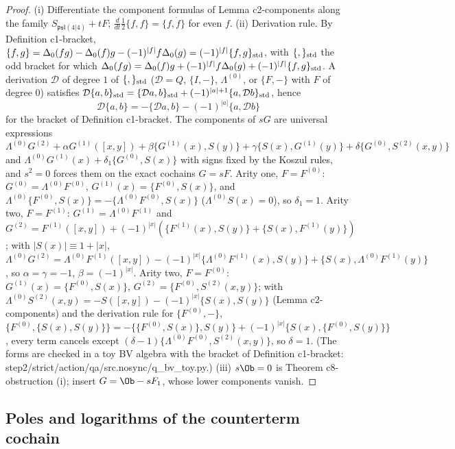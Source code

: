 \begin{proof}
(i) Differentiate the component formulas of Lemma c2-components along the family $S_{\mathfrak{psl}(4|4)}+tF$; $\tfrac{d}{dt}\tfrac12\{f,f\}=\{f,\dot f\}$ for even $f$. (ii) Derivation rule. By Definition c1-bracket, $\{f,g\}=\Delta_0(fg)-\Delta_0(f)g-(-1)^{|f|}f\Delta_0(g)=(-1)^{|f|}\{f,g\}_{\rm std}$, with $\{,\}_{\rm std}$ the odd bracket for which $\Delta_0(fg)=\Delta_0(f)g+(-1)^{|f|}f\Delta_0(g)+(-1)^{|f|}\{f,g\}_{\rm std}$. A derivation $\mathcal D$ of degree $1$ of $\{,\}_{\rm std}$ ($\mathcal D=Q$, $\{I,-\}$, $\Lambda^{(0)}$, or $\{F,-\}$ with $F$ of degree $0$) satisfies $\mathcal D\{a,b\}_{\rm std}=\{\mathcal Da,b\}_{\rm std}+(-1)^{|a|+1}\{a,\mathcal Db\}_{\rm std}$, hence
\[
\mathcal D\{a,b\}=-\{\mathcal Da,b\}-(-1)^{|a|}\{a,\mathcal Db\}
\]
for the bracket of Definition c1-bracket. The components of $sG$ are universal expressions $\Lambda^{(0)}G^{(2)}+\alpha G^{(1)}([x,y])+\beta\{G^{(1)}(x),S(y)\}+\gamma\{S(x),G^{(1)}(y)\}+\delta\{G^{(0)},S^{(2)}(x,y)\}$ and $\Lambda^{(0)}G^{(1)}(x)+\delta_1\{G^{(0)},S(x)\}$ with signs fixed by the Koszul rules, and $s^2=0$ forces them on the exact cochains $G=sF$. Arity one, $F=F^{(0)}$: $G^{(0)}=\Lambda^{(0)}F^{(0)}$, $G^{(1)}(x)=\{F^{(0)},S(x)\}$, and $\Lambda^{(0)}\{F^{(0)},S(x)\}=-\{\Lambda^{(0)}F^{(0)},S(x)\}$ ($\Lambda^{(0)}S(x)=0$), so $\delta_1=1$. Arity two, $F=F^{(1)}$: $G^{(1)}=\Lambda^{(0)}F^{(1)}$ and $G^{(2)}=F^{(1)}([x,y])+(-1)^{|x|}(\{F^{(1)}(x),S(y)\}+\{S(x),F^{(1)}(y)\})$; with $|S(x)|\equiv1+|x|$, $\Lambda^{(0)}G^{(2)}=\Lambda^{(0)}F^{(1)}([x,y])-(-1)^{|x|}\{\Lambda^{(0)}F^{(1)}(x),S(y)\}+\{S(x),\Lambda^{(0)}F^{(1)}(y)\}$, so $\alpha=\gamma=-1$, $\beta=(-1)^{|x|}$. Arity two, $F=F^{(0)}$: $G^{(1)}(x)=\{F^{(0)},S(x)\}$, $G^{(2)}=\{F^{(0)},S^{(2)}(x,y)\}$; with $\Lambda^{(0)}S^{(2)}(x,y)=-S([x,y])-(-1)^{|x|}\{S(x),S(y)\}$ (Lemma c2-components) and the derivation rule for $\{F^{(0)},-\}$, $\{F^{(0)},\{S(x),S(y)\}\}=-\{\{F^{(0)},S(x)\},S(y)\}+(-1)^{|x|}\{S(x),\{F^{(0)},S(y)\}\}$, every term cancels except $(\delta-1)\{\Lambda^{(0)}F^{(0)},S^{(2)}(x,y)\}$, so $\delta=1$. (The forms are checked in a toy BV algebra with the bracket of Definition c1-bracket: step2/strict/action/qa/src.nosync/q\_bv\_toy.py.) (iii) $s\Ob=0$ is Theorem c8-obstruction (i); insert $G=\Ob-sF_1$, whose lower components vanish.
\end{proof}

\subsection{Poles and logarithms of the counterterm cochain}


